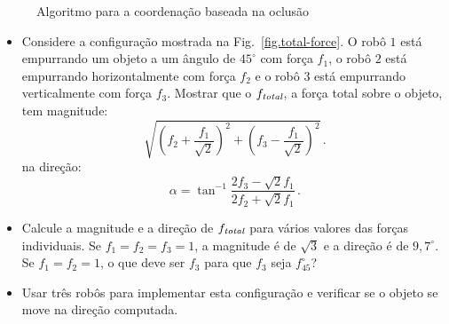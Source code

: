 \begin{figure}
\begin{center}
\end{center}
\caption{Algoritmo para a coordenação baseada na oclusão}\label{fig.FSM-swarm-pushing}
\end{figure}

\begin{framed}
\begin{itemize}
\item Considere a configuração mostrada na Fig.~\ref{fig.total-force}. O robô $1$ está empurrando um objeto a um ângulo de $45^{\circ}$ com força $f_1$, o robô $2$ está empurrando horizontalmente com força $f_2$ e o robô $3$ está empurrando verticalmente com força $f_3$. Mostrar que o $f_{\textit{\scriptsize total}}$, a força total sobre o objeto, tem magnitude:
\[
\sqrt{\left(f_2+\frac{f_1}{\sqrt{2}}\right)^2+\left(f_3-\frac{f_1}{\sqrt{2}}\right)^2}\,.
\]
na direção:
\[
\alpha = \tan^{-1} \frac{2f_3-\sqrt{2}f_1}{2f_2+\sqrt{2}f_1}\,.
\]
\item Calcule a magnitude e a direção de $f_{\textit{\scriptsize total}}$ para vários valores das forças individuais. Se $f_1=f_2=f_3=1$, a magnitude é de $\sqrt{3}$ e a direção é de $9,7^{\circ}$. Se $f_1=f_2=1$, o que deve ser $f_3$ para que $f_3$ seja $f_45^{\circ}$?
\item Usar três robôs para implementar esta configuração e verificar se o objeto se move na direção computada.
\end{itemize}
\end{framed}


